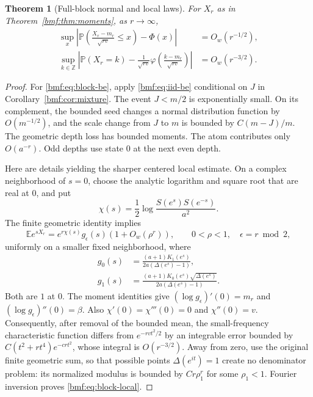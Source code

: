 \documentclass[11pt]{article}
\numberwithin{equation}{section}
\newtheorem{theorem}{Theorem}[section]
\theoremstyle{definition}
\theoremstyle{remark}
\newcommand{\Z}{\mathbb{Z}}
\newcommand{\E}{\mathbb E}
\newcommand{\Prob}{\mathbb P}
\newcommand{\ph}{\varphi}
\begin{document}
\begin{theorem}[Full-block normal and local laws]\label{bmf:thm:block-normal}
For $X_r$ as in Theorem~\ref{bmf:thm:moments}, as $r\to\infty$,
\begin{align}
 \sup_x\left|
 \Prob\left(\frac{X_r-m_r}{\sqrt{rv}}\leq x\right)-\Phi(x)
 \right|&=O_w(r^{-1/2}),\label{bmf:eq:block-be}\\
 \sup_{k\in\Z}\left|
 \Prob(X_r=k)-\frac1{\sqrt{rv}}
       \ph\left(\frac{k-m_r}{\sqrt{rv}}\right)
 \right|&=O_w(r^{-3/2}).\label{bmf:eq:block-local}
\end{align}
\end{theorem}
\begin{proof}
For \eqref{bmf:eq:block-be}, apply \eqref{bmf:eq:iid-be} conditional on
$J$ in Corollary~\ref{bmf:cor:mixture}. The event $J<m/2$ is exponentially
small. On its complement, the bounded seed changes a normal
distribution function by $O(m^{-1/2})$, and the scale change from
$J$ to $m$ is bounded by $C(m-J)/m$. The geometric depth loss has
bounded moments. The atom contributes only $O(a^{-r})$.
Odd depths use state $0$ at the next even depth.

Here are details yielding the sharper centered local estimate.
On a complex neighborhood of $s=0$, choose the analytic logarithm
and square root that are real at $0$, and put
\begin{equation}\label{bmf:eq:chi-def}
 \chi(s)=\frac12\log\frac{S(e^s)S(e^{-s})}{a^2}.
\end{equation}
The finite geometric identity implies
\begin{equation}\label{bmf:eq:block-analytic}
 \E e^{sX_r}
 =e^{r\chi(s)}g_{\epsilon}(s)(1+O_w(\rho^r)),
 \qquad 0<\rho<1,\quad \epsilon=r\bmod2,
\end{equation}
uniformly on a smaller fixed neighborhood, where
\begin{align}
 g_0(s)&=\frac{(a+1)K_1(e^s)}
                   {2a(\Delta(e^s)-1)},\label{bmf:eq:g-even}\\
 g_1(s)&=\frac{(a+1)K_0(e^s)\sqrt{\Delta(e^s)}}
                   {2a(\Delta(e^s)-1)}.\label{bmf:eq:g-odd}
\end{align}
Both are $1$ at $0$. The moment identities give
$(\log g_\epsilon)'(0)=m_r$ and
$(\log g_\epsilon)''(0)=\beta$. Also
$\chi'(0)=\chi'''(0)=0$ and $\chi''(0)=v$.
Consequently, after removal of the bounded mean,
the small-frequency characteristic function differs from
$e^{-rvt^2/2}$ by an integrable error bounded by
$C(t^2+rt^4)e^{-crt^2}$, whose integral is $O(r^{-3/2})$.
Away from zero, use the original finite geometric sum, so that
possible points $\Delta(e^{it})=1$ create no denominator problem:
its normalized modulus is bounded by $Cr\rho_1^r$ for some
$\rho_1<1$. Fourier inversion proves \eqref{bmf:eq:block-local}.
\end{proof}
\end{document}
